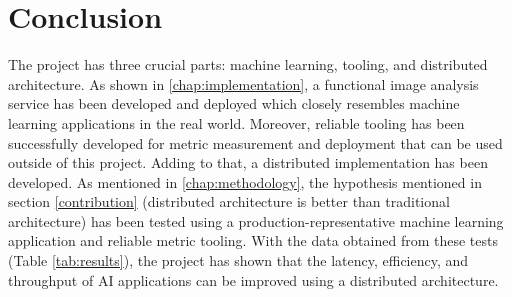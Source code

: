\documentclass{report}
\def\backmatter{%
    \setcounter{section}{0}
    \renewcommand{\thesection}{\Alph{section}}
}%
\begin{document}
\chapter{Conclusion}\label{chap:conclusion}
The project has three crucial parts: machine learning, tooling, and distributed architecture.
As shown in \cref{chap:implementation}, a functional image analysis service has been developed and deployed which closely resembles machine learning applications in the real world.
Moreover, reliable tooling has been successfully developed for metric measurement and deployment that can be used outside of this project.
Adding to that, a distributed implementation has been developed.
As mentioned in \cref{chap:methodology}, the hypothesis mentioned in section \ref{contribution} (distributed architecture is better than traditional architecture) has been tested using a production-representative machine learning application and reliable metric tooling.
With the data obtained from these tests (Table \ref{tab:results}), the project has shown that the latency, efficiency, and throughput of AI applications can be improved using a distributed architecture.

\backmatter

\printbibliography
\end{document}
